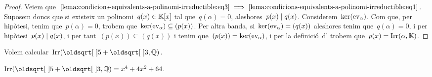 \documentclass[../../main.tex]{subfiles}
\begin{document}
\begin{proof}
        Veiem que~\(\eqref{lema:condicions-equivalents-a-polinomi-irreductible:eq3}\implies\eqref{lema:condicions-equivalents-a-polinomi-irreductible:eq1}\).
        Suposem doncs que si existeix un polinomi~\(q(x)\in\mathbb{K}[x]\) tal que~\(q(\alpha)=0\), aleshores~\(p(x)\mathrel{|} q(x)\).
        Considerem~\(\operatorname{ker}(\mathrm{ev}_{\alpha})\).
        Com que, per hipòtesi, tenim que~\(p(\alpha)=0\), trobem que~\(\operatorname{ker}(\mathrm{ev}_{\alpha})\subseteq(p(x))\).
        Per altra banda, si~\(\operatorname{ker}(\mathrm{ev}_{\alpha})=(q(x))\) aleshores tenim que~\(q(\alpha)=0\), i per hipòtesi~\(p(x)\mathrel{|} q(x)\), i per tant~\((p(x))\subseteq(q(x))\) i tenim que~\((p(x))=\operatorname{ker}(\mathrm{ev}_{\alpha})\), i per la definició~d' trobem que~\(p(x)=\operatorname{Irr}(\alpha,\mathbb{K})\).
    \end{proof}
    \begin{example}
        Volem calcular~\(\Irr(\sqrt{5}+\sqrt{3},\QQ)\).
    \end{example}
    \begin{solution}
        \(\Irr(\sqrt{5}+\sqrt{3},\QQ)=x^{4}+4x^{2}+64\).
    \end{solution}
\end{document}
